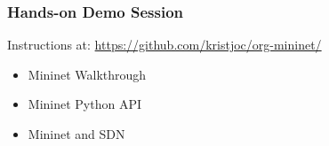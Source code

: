 \documentclass{beamer}
\begin{document}
\begin{frame}
  \frametitle{Hands-on Demo Session}
  \begin{block}{Instructions at:}
    \centering
    \url{https://github.com/kristjoc/org-mininet/}
  \end{block}
\end{frame}

\begin{frame}[plain]
  \begin{itemize}
  \item[] {\color{gray}Mininet Walkthrough}
    \vspace{1cm}
  \item[] {\color{gray}Mininet Python API}
    \vspace{1cm}
  \item[]
    \begin{large}
      Mininet and SDN
    \end{large}
  \end{itemize}
  \addtocounter{framenumber}{-1}
\end{frame}
\end{document}

